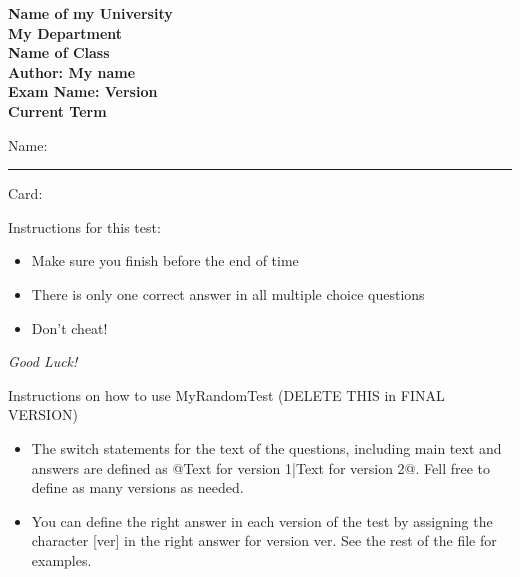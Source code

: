 \documentclass[10pt]{examdesign}
\newcommand{\myversion}{} %
\begin{document}
\begin{examtop}

\begin{center}
    \textbf{\Large  Name of my University} \\
    \textbf{\Large  My Department} \vspace{0.5cm}  \\
    \textbf{\Large  Name of Class} \\
	\textbf{\Large  Author: My name} \\
    \textbf{\Large Exam Name: Version \myversion } \\
    \textbf{\Large Current Term}
 \end{center}

\vspace{1cm}
Name: \rule{4in}{.4pt}  \quad  \noindent Card:\enspace\hrulefill


\vspace{1cm}

\small

\begin{framed}

Instructions for this test:

\begin{itemize}

	\item Make sure you finish before the end of time

	\item There is only one correct answer in all multiple choice questions

	\item Don't cheat!

\end{itemize}

\vspace{0.5cm}

{\large \emph{Good Luck!}}
\end{framed}

\begin{framed}
	Instructions on how to use MyRandomTest (DELETE THIS in FINAL VERSION)
	\begin{itemize}

		\item The switch statements for the text of the questions, including main text and answers are defined as @{Text for version 1}|{Text for version 2}@.  Fell free to define as many versions as needed.

		\item You can define the right answer in each version of the test by assigning the character [ver] in the right answer for version ver. See the rest of the file for examples.


	\end{itemize}

\end{framed}

\end{examtop}
\end{document}
